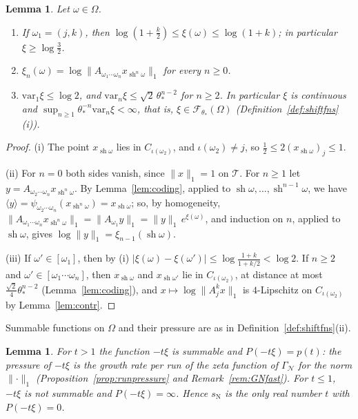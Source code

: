 \documentclass[11pt]{amsart}
\newtheorem{lemma}[proposition]{Lemma}
\theoremstyle{definition}
\theoremstyle{remark}
\newcommand{\cF}{\mathcal F}
\newcommand{\cT}{\mathcal T}
\newcommand{\GN}{\Gamma_{\mathcal N}}
\newcommand{\sN}{s_{\mathrm N}}
\newcommand{\abs}[1]{\lvert #1\rvert}
\newcommand{\norm}[1]{\lVert #1\rVert}
\newcommand{\pr}[1]{\langle #1\rangle}
\begin{document}
\begin{lemma}\label{lem:xi}
Let $\omega\in\Omega$.
\begin{enumerate}
\item[(i)] If $\omega_1=(j,k)$, then $\log(1+\frac k2)\le\xi(\omega)\le\log(1+k)$; in particular $\xi\ge\log\frac32$.
\item[(ii)] $\xi_n(\omega)=\log\norm{A_{\omega_1\cdots\omega_n}x_{\operatorname{sh}^n\omega}}_1$ for every $n\ge0$.
\item[(iii)] $\mathrm{var}_1\xi\le\log2$, and $\mathrm{var}_n\xi\le\sqrt2\,\theta_*^{n-2}$ for $n\ge2$. In particular $\xi$ is continuous and $\sup_{n\ge1}\theta_*^{-n}\mathrm{var}_n\xi<\infty$, that is, $\xi\in\cF_{\theta_*}(\Omega)$ (Definition~\ref{def:shiftfns}(i)).
\end{enumerate}
\end{lemma}

\begin{proof}
(i) The point $x_{\operatorname{sh}\omega}$ lies in $C_{\iota(\omega_2)}$, and $\iota(\omega_2)\ne j$, so $\frac12\le2(x_{\operatorname{sh}\omega})_j\le1$.

(ii) For $n=0$ both sides vanish, since $\norm x_1=1$ on $\cT$. For $n\ge1$ let $y=A_{\omega_2\cdots\omega_n}x_{\operatorname{sh}^n\omega}$. By Lemma~\ref{lem:coding}, applied to $\operatorname{sh}\omega,\dots,\operatorname{sh}^{n-1}\omega$, we have $\pr y=\psi_{\omega_2\cdots\omega_n}(x_{\operatorname{sh}^n\omega})=x_{\operatorname{sh}\omega}$; so, by homogeneity, $\norm{A_{\omega_1\cdots\omega_n}x_{\operatorname{sh}^n\omega}}_1=\norm{A_{\omega_1}y}_1=\norm y_1\,e^{\xi(\omega)}$, and induction on $n$, applied to $\operatorname{sh}\omega$, gives $\log\norm y_1=\xi_{n-1}(\operatorname{sh}\omega)$.

(iii) If $\omega'\in[\omega_1]$, then by (i) $\abs{\xi(\omega)-\xi(\omega')}\le\log\frac{1+k}{1+k/2}<\log2$. If $n\ge2$ and $\omega'\in[\omega_1\cdots\omega_n]$, then $x_{\operatorname{sh}\omega}$ and $x_{\operatorname{sh}\omega'}$ lie in $C_{\iota(\omega_2)}$, at distance at most $\frac{\sqrt2}4\theta_*^{n-2}$ (Lemma~\ref{lem:coding}), and $x\mapsto\log\norm{A_j^kx}_1$ is $4$-Lipschitz on $C_{\iota(\omega_2)}$ by Lemma~\ref{lem:contr}.
\end{proof}

Summable functions on $\Omega$ and their pressure are as in Definition~\ref{def:shiftfns}(ii).

\begin{lemma}\label{lem:pressure}
For $t>1$ the function $-t\xi$ is summable and $P(-t\xi)=p(t)$: the pressure of $-t\xi$ is the growth rate per run of the zeta function of $\GN$ for the norm $\norm\cdot_1$ (Proposition~\ref{prop:runpressure} and Remark~\ref{rem:GNfast}). For $t\le1$, $-t\xi$ is not summable and $P(-t\xi)=\infty$. Hence $\sN$ is the only real number $t$ with $P(-t\xi)=0$.
\end{lemma}
\end{document}
